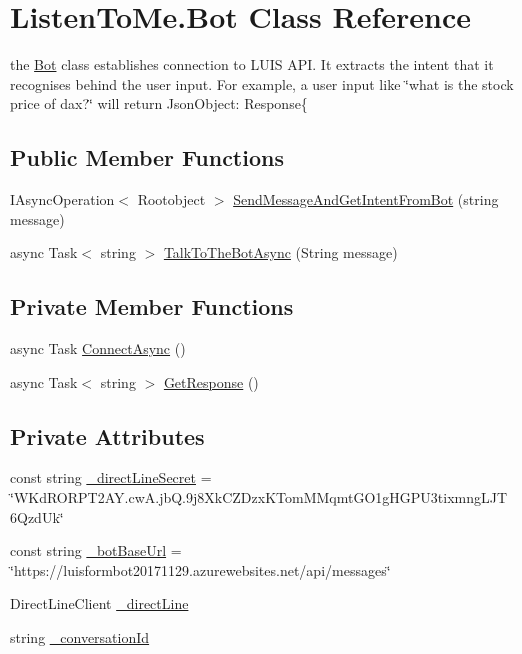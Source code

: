 \hypertarget{class_listen_to_me_1_1_bot}{}\section{Listen\+To\+Me.\+Bot Class Reference}
\label{class_listen_to_me_1_1_bot}


the \hyperlink{class_listen_to_me_1_1_bot}{Bot} class establishes connection to L\+U\+IS A\+PI. It extracts the intent that it recognises behind the user input. For example, a user input like \char`\"{}what is the stock price of dax?\char`\"{} will return Json\+Object\+: Response\{  


\subsection*{Public Member Functions}
\begin{DoxyCompactItemize}
\item 
I\+Async\+Operation$<$ Rootobject $>$ \hyperlink{class_listen_to_me_1_1_bot_a3730a1ccd4cbf3233cde6fe324c9c11e}{Send\+Message\+And\+Get\+Intent\+From\+Bot} (string message)
\item 
async Task$<$ string $>$ \hyperlink{class_listen_to_me_1_1_bot_a5740a5a6a3de1d82aa5cceae3af8f2da}{Talk\+To\+The\+Bot\+Async} (String message)
\end{DoxyCompactItemize}
\subsection*{Private Member Functions}
\begin{DoxyCompactItemize}
\item 
async Task \hyperlink{class_listen_to_me_1_1_bot_a9eb615aac9b31487a93a157b28324c4e}{Connect\+Async} ()
\item 
async Task$<$ string $>$ \hyperlink{class_listen_to_me_1_1_bot_afbc2da8d2b8a62a2557f19d58c770385}{Get\+Response} ()
\end{DoxyCompactItemize}
\subsection*{Private Attributes}
\begin{DoxyCompactItemize}
\item 
const string \hyperlink{class_listen_to_me_1_1_bot_a3f7fa2c3cbea4ec11f5a75e2e8c9c72d}{\+\_\+direct\+Line\+Secret} = \char`\"{}W\+Kd\+R\+O\+R\+P\+T2\+A\+Y.\+cw\+A.\+jb\+Q.\+9j8\+Xk\+C\+Z\+Dzx\+K\+Tom\+M\+Mqmt\+G\+O1g\+H\+G\+P\+U3tixmng\+L\+J\+T6\+Qzd\+Uk\char`\"{}
\item 
const string \hyperlink{class_listen_to_me_1_1_bot_a32012403ad764abea0ee20b5cccbd559}{\+\_\+bot\+Base\+Url} = \char`\"{}https\+://luisformbot20171129.\+azurewebsites.\+net/api/messages\char`\"{}
\item 
Direct\+Line\+Client \hyperlink{class_listen_to_me_1_1_bot_a964ea223816ac25f4ccf8357edb2f5ad}{\+\_\+direct\+Line}
\item 
string \hyperlink{class_listen_to_me_1_1_bot_a2537a949a0ae2f9adab1e080ad2a9c3a}{\+\_\+conversation\+Id}
\end{DoxyCompactItemize}
